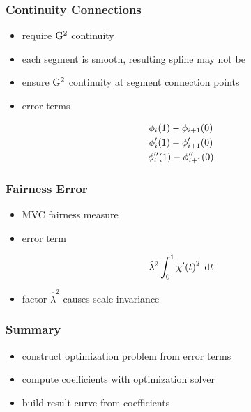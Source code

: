 \documentclass[mathserif]{beamer}
\begin{document}
		\begin{frame}
			\frametitle{Continuity Connections}
			\begin{itemize}
				\item require \(\mathrm{G}^{2}\) continuity
				\item each segment is smooth, resulting spline may not be
				\item ensure \(\mathrm{G}^{2}\) continuity at segment connection points
				\item error terms
			\end{itemize}
			\begin{equation*}
				\begin{gathered}
					\phi_i\!\left( 1 \right) - \phi_{i + 1}\!\left( 0 \right)\\
					\phi'_i\!\left( 1 \right) - \phi'_{i + 1}\!\left( 0 \right)\\
					\phi''_i\!\left( 1 \right) - \phi''_{i + 1}\!\left( 0 \right)
				\end{gathered}
			\end{equation*}
		\end{frame}

		\begin{frame}
			\frametitle{Fairness Error}
			\begin{itemize}
				\item MVC fairness measure
				\item error term
			\end{itemize}
			\begin{equation*}
				\hat{\lambda}^2\int_{0}^{1} \chi'\!\left( t \right)^2 \; \mathrm{d}t
			\end{equation*}
			\begin{itemize}
				\item factor \(\hat{\lambda}^2\) causes scale invariance
			\end{itemize}
		\end{frame}

		\begin{frame}
			\frametitle{Summary}
			\begin{itemize}
				\item construct optimization problem from error terms
				\item compute coefficients with optimization solver
				\item build result curve from coefficients
			\end{itemize}
		\end{frame}
\end{document}
